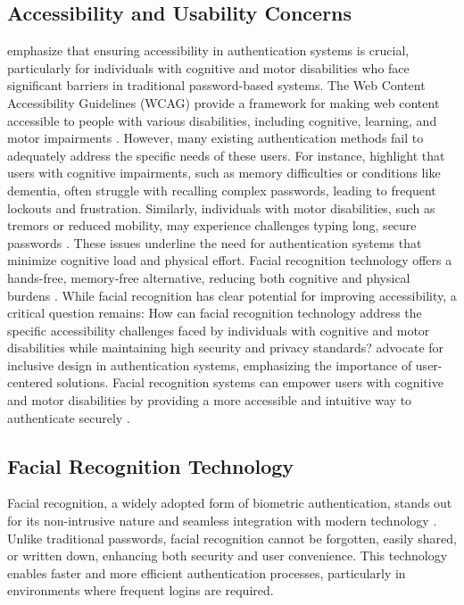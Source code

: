 \subsection{Accessibility and Usability Concerns}
\textcite{Furnell2022} emphasize that ensuring accessibility in authentication systems is crucial, particularly for individuals with cognitive and motor disabilities who face significant barriers in traditional password-based systems. The Web Content Accessibility Guidelines (WCAG) provide a framework for making web content accessible to people with various disabilities, including cognitive, learning, and motor impairments \autocite{Brewer2023}. However, many existing authentication methods fail to adequately address the specific needs of these users.
For instance, \textcite{Farid2019} highlight that users with cognitive impairments, such as memory difficulties or conditions like dementia, often struggle with recalling complex passwords, leading to frequent lockouts and frustration. Similarly, individuals with motor disabilities, such as tremors or reduced mobility, may experience challenges typing long, secure passwords \autocite{Renaud2020}. These issues underline the need for authentication systems that minimize cognitive load and physical effort.
Facial recognition technology offers a hands-free, memory-free alternative, reducing both cognitive and physical burdens \autocite{Bhatt2011}. While facial recognition has clear potential for improving accessibility, a critical question remains: How can facial recognition technology address the specific accessibility challenges faced by individuals with cognitive and motor disabilities while maintaining high security and privacy standards?
\textcite{Lazar2015} advocate for inclusive design in authentication systems, emphasizing the importance of user-centered solutions. Facial recognition systems can empower users with cognitive and motor disabilities by providing a more accessible and intuitive way to authenticate securely \autocite{Furnell2022}.

\subsection{Facial Recognition Technology}
Facial recognition, a widely adopted form of biometric authentication, stands out for its non-intrusive nature and seamless integration with modern technology \autocite{Furnell2022}. Unlike traditional passwords, facial recognition cannot be forgotten, easily shared, or written down, enhancing both security and user convenience. This technology enables faster and more efficient authentication processes, particularly in environments where frequent logins are required.

